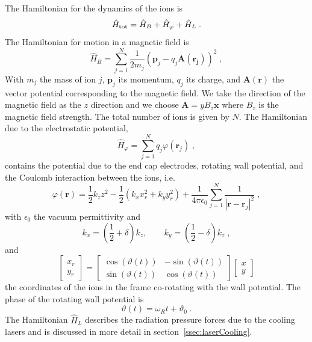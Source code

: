 \documentclass[
  aps,
  reprint,
  twoside,
  showpacs,
  amsmath,
  amssymb,
  floatfix
]{revtex4-1}
\begin{document}
The Hamiltonian for the dynamics of the ions is
\begin{equation}
\hat H_{\rm tot} = \hat H_B + \hat H_{\varphi} + \hat H_L\;.
\label{eqn:Hamiltonian}
\end{equation}
The Hamiltonian for motion in a magnetic field is 
\begin{equation}
\hat H_B =
\sum_{j=1}^N\frac{1}{2m_j}(\mathbf{p}_j-q_j\mathbf{A}(\mathbf{r_j}))^2\;,
\end{equation}
With $m_j$ the mass of ion $j$, $\mathbf{p}_j$ its momentum, $q_j$ its
charge,  and
$\mathbf{A}(\mathbf{r})$ the vector potential corresponding to the
magnetic field.  We take the direction of the magnetic field as the $z$
direction and we choose $\mathbf{A}=yB_z\mathbf{x}$ where $B_z$ is the
magnetic field strength.  The total number of ions is given by $N$.  The
Hamiltonian due to the electrostatic potential,
\begin{equation}
\hat H_{\varphi}=\sum_{j=1}^N q_j\varphi(\mathbf{r}_j)\;,
\end{equation}
contains the potential due to the end cap electrodes, rotating wall
potential, and the Coulomb interaction between the ions, i.e.
\begin{equation}
\varphi(\mathbf{r}) = \frac{1}{2}k_z z^2 - 
\frac{1}{2} \left(k_x x_r^2 + k_y y_r^2\right)+
\frac{1}{4\pi\epsilon_0}\sum_{j=1}^N\frac{1}{|\mathbf{r}-\mathbf{r}_j|^2}\;,
\end{equation}
with $\epsilon_0$ the vacuum permittivity and 
\begin{equation}
k_x=\left(\frac{1}{2}+\delta\right)k_z,\qquad 
k_y=\left(\frac{1}{2}-\delta\right)k_z\;,
\end{equation}
and
\begin{equation}
\left[
\begin{array}{c}
x_r\\
y_r
\end{array}\right] =
\left[
\begin{array}{cc}
\cos(\vartheta(t)) & -\sin(\vartheta(t))\\
\sin(\vartheta(t)) & \cos(\vartheta(t))
\end{array}\right]
\left[\begin{array}{c}
x\\
y
\end{array}\right]
\end{equation}
the coordinates of the ions in the frame co-rotating with the wall
potential.  The phase of the rotating wall potential is
\begin{equation}
\vartheta(t)=\omega_R t+\vartheta_0\;.
\end{equation}
The Hamiltonian $\hat H_L$ describes the radiation pressure forces due
to the cooling lasers and is discussed in more detail in
section~\ref{ssec:laserCooling}.
\end{document}
